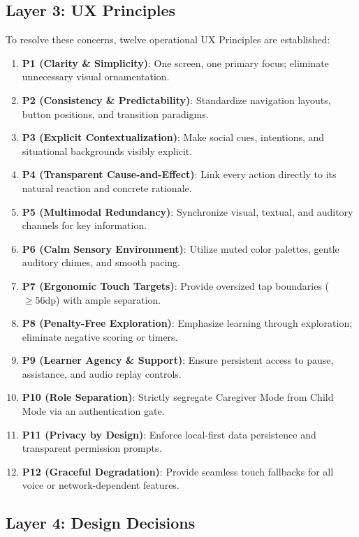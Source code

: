 \subsection{Layer 3: UX Principles}

To resolve these concerns, twelve operational UX Principles are established:
\begin{enumerate}
    \item \textbf{P1 (Clarity \& Simplicity)}: One screen, one primary focus; eliminate unnecessary visual ornamentation.
    \item \textbf{P2 (Consistency \& Predictability)}: Standardize navigation layouts, button positions, and transition paradigms.
    \item \textbf{P3 (Explicit Contextualization)}: Make social cues, intentions, and situational backgrounds visibly explicit.
    \item \textbf{P4 (Transparent Cause-and-Effect)}: Link every action directly to its natural reaction and concrete rationale.
    \item \textbf{P5 (Multimodal Redundancy)}: Synchronize visual, textual, and auditory channels for key information.
    \item \textbf{P6 (Calm Sensory Environment)}: Utilize muted color palettes, gentle auditory chimes, and smooth pacing.
    \item \textbf{P7 (Ergonomic Touch Targets)}: Provide oversized tap boundaries ($\ge 56\text{dp}$) with ample separation.
    \item \textbf{P8 (Penalty-Free Exploration)}: Emphasize learning through exploration; eliminate negative scoring or timers.
    \item \textbf{P9 (Learner Agency \& Support)}: Ensure persistent access to pause, assistance, and audio replay controls.
    \item \textbf{P10 (Role Separation)}: Strictly segregate Caregiver Mode from Child Mode via an authentication gate.
    \item \textbf{P11 (Privacy by Design)}: Enforce local-first data persistence and transparent permission prompts.
    \item \textbf{P12 (Graceful Degradation)}: Provide seamless touch fallbacks for all voice or network-dependent features.
\end{enumerate}

\subsection{Layer 4: Design Decisions}

